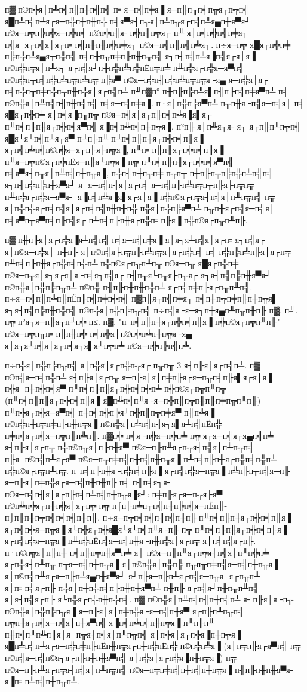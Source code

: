 п▓ п©п╬я│п╩п╣п╢п╫п╣п╣ п╡я─п╣п╪я▐ я─п╟п╥п╡п╦я┌п╦п╣ я█п╩п╣п╨я┌я─п╬п╫п╫п╬ п╡я▀я┤п╦я│п╩п╦я┌п╣п╩я▄п╫я▀я┘ п©я─п╦п╠п╬я─п╬п╡ п©п╬п╢я┘п╬п╢п╦я┌
п╨ я│п╡п╬п╣п╪я┐ п╣я│я┌п╣я│я┌п╡п╣п╫п╫п╬п╪я┐ п©я─п╣п╢п╣п╩я┐. п÷я─п╦ я█я┌п╬п╪ п╠п╬п╩я▄я┬п╬п╣ п╡п╫п╦п╪п╟п╫п╦п╣ я┐п╢п╣п╩я▐п╣я┌я│я▐
п©п╬п╦я│п╨я┐ я┌п╣я┘п╫п╬п╩п╬пЁп╦п╧ п╨п╬я┌п╬я─я▀п╣ п©п╬п╥п╡п╬п╩п╦п╩п╦ п╠я▀ п©я─п╬п╢п╬п╩п╤п╦я┌я▄ я─п╬я│я┌ п╡п╬п╥п╪п╬п╤п╫п╬я│я┌п╣п╧
п╜п▓п° п╫п╟п╠п╩я▌п╢п╟п╣п╪я▀п╧ п╡ п©п╬я│п╩п╣п╢п╫п╣п╣ п╡я─п╣п╪я▐. п·я│п╬п╠я▀п╧ п╦п╫я┌п╣я─п╣я│ п╡ я█я┌п╬п╧ я│п╡я▐п╥п╦
п©я─п╣я│я┌п╟п╡п╩я▐я▌я┌ п╨п╡п╟п╫я┌п╬п╡я▀п╣ я▐п╡п╩п╣п╫п╦я▐. п²п╟ я│п╩я┐я┘я┐ я┌п╟п╨п╦п╣ я█я└я└п╣п╨я┌я▀ п╨п╟п╨ п╨п╡п╟п╫я┌п╬п╡п╟я▐
я┌п╣п╩п╣п©п╬я─я┌п╟я├п╦я▐, п╨п╡п╟п╫я┌п╬п╡п╟я▐ п╨я─п╦п©я┌п╬пЁя─п╟я└п╦я▐ п╦ п╨п╡п╟п╫я┌п╬п╡я▀п╣ п╡я▀я┤п╦я│п╩п╣п╫п╦я▐, п╬п╢п╫п╦п╪ п╦п╥
п╫п╟п╦п╠п╬п╩п╣п╣ я┐п╢п╬п╠п╫я▀я┘ я│я─п╣п╢я│я┌п╡ я─п╣п╟п╩п╦п╥п╟я├п╦п╦ п╨п╬я┌п╬я─я▀я┘ я▐п╡п╩я▐я▌я┌я│я▐ п╬п©я┌п╦я┤п╣я│п╨п╦п╣ п╦ я│п╬п╬я┌п╡п╣я│я┌п╡п╣п╫п╫п╬
п╬я│п╬п╠я▀п╧ п╦п╫я┌п╣я─п╣я│ п╡я▀п╥я▀п╡п╟п╣я┌ п╨п╡п╟п╫я┌п╬п╡п╟я▐ п╬п©я┌п╦п╨п╟.  

п▓ п╫п╟я│я┌п╬я▐я┴п╣п╣ п╡я─п╣п╪я▐ я│я┐я┴п╣я│я┌п╡я┐п╣я┌ я│п©я─п╬я│ п╫п╟ я│п©п╣я├п╦п╟п╩п╦я│я┌п╬п╡ п╡ п╬п╠п╩п╟я│я┌п╦ п╨п╡п╟п╫я┌п╬п╡п╬п╧
п╬п©я┌п╦п╨п╦ п©я─п╦ я█я┌п╬п╪ п©я─п╦я│я┐я┌я│я┌п╡я┐п╣я┌ п╢п╦я└п╦я├п╦я┌ я┐я┤п╣п╠п╫я▀я┘ п©п╬я│п╬п╠п╦п╧ п©п╬ п╢п╟п╫п╫п╬п╧
я┌п╣п╪п╟я┌п╦п╨п╣. п÷я─п╣п╢п╩п╟пЁп╟п╣п╪п╬п╣ п▓п╟я┬п╣п╪я┐ п╡п╫п╦п╪п╟п╫п╦я▌ я┐я┤п╣п╠п╫п╬п╣ п©п╬я│п╬п╠п╦п╣ п÷п╣я┌я─я┐п╫я▄п╨п╦п╫п╟
п▓. п╝. п╦ п°я┐я─п╟я┬п╨п╬ п≤. п▓. "п п╡п╟п╫я┌п╬п╡п╟я▐ п╬п©я┌п╦п╨п╟" п©я─п╦п╥п╡п╟п╫п╬ п╡п╬я│п©п╬п╩п╫п╦я┌я▄
я│я┐я┴п╣я│я┌п╡я┐я▌я┴п╦п╧ п©я─п╬п╠п╣п╩. 

п÷п╬я│п╬п╠п╦п╣ я│п╬я│я┌п╬п╦я┌ п╦п╥ 3 я┤п╟я│я┌п╣п╧. п▓ п©п╣я─п╡п╬п╧ я┤п╟я│я┌п╦ я─п╟я│я│п╪п╟я┌я─п╦п╡п╟я▌я┌я│я▐ п╬я│п╫п╬п╡я▀
п╨п╡п╟п╫я┌п╬п╡п╬п╧ п╬п©я┌п╦п╨п╦ (п╨п╡п╟п╫я┌п╬п╡п╟я▐ я█п╩п╣п╨я┌я─п╬п╢п╦п╫п╟п╪п╦п╨п╟) п╨п╬я┌п╬я─я▀п╣ п╫п╣п╬п╠я┘п╬п╢п╦п╪я▀ п╢п╩я▐
п©п╬п╫п╦п╪п╟п╫п╦я▐ п©п╬я│п╩п╣п╢я┐я▌я┴п╣пЁп╬ п╪п╣я┌п╣я─п╦п╟п╩п╟. п▓п╬ п╡я┌п╬я─п╬п╧ п╦ я┌я─п╣я┌я▄п╣п╧
я┤п╟я│я┌п╦ п╬п©п╦я│п╟п╫я▀ п©я─п╟п╨я┌п╦я┤п╣я│п╨п╦п╣ п╟я│п©п╣п╨я┌я▀ п©я─п╦п╪п╣п╫п╣п╫п╦я▐ п╨п╡п╟п╫я┌п╬п╡п╬п╧
п╬п©я┌п╦п╨п╦. п п╡п╟п╫я┌п╬п╡п╟я▐ я┌п╣п╬я─п╦я▐ п╩п╟п╥п╣я─п╟ я─п╟я│п╪п╬я┌я─п╣п╫п╫п╟ п╡ п╢п╡я┐я┘ п©я─п╣п╢я│я┌п╟п╡п╩п╣п╫п╦я▐я┘:
п╪п╟я┌я─п╦я├я▀ п©п╩п╬я┌п╫п╬я│я┌п╦ п╦ п⌠п╟п╧п╥п╣п╫п╠п╣я─пЁп╟-п⌡п╟п╫п╤п╣п╡п╣п╫п╟. п÷я─п╦п╡п╣п╢п╣п╫п╟ п╨п╡п╟п╫я┌п╬п╡п╟я▐ я┌п╣п╬я─п╦я▐
я└п╬я┌п╬я█я└я└п╣п╨я┌п╟ п╦ п╨п╡п╟п╫я┌п╬п╡п╟я▐ я┌п╣п╬я─п╦я▐ п╨п╬пЁп╣я─п╣п╫я┌п╫п╬я│я┌п╦ я│п╡п╣я┌п╟. п·п©п╦я│п╟п╫ п╡п╟п╤п╫я▀п╧
я│ п©я─п╟п╨я┌п╦я┤п╣я│п╨п╬п╧ я┌п╬я┤п╨п╦ п╥я─п╣п╫п╦я▐ я│п©п╬я│п╬п╠ п╦п╥п╪п╣я─п╣п╫п╦я▐ я│п©п╣п╨я┌я─п╟п╩я▄п╫я▀я┘
я┘п╟я─п╟п╨я┌п╣я─п╦я│я┌п╦п╨ я│п╡п╣я┌п╟ п╬я│п╫п╬п╡п╟п╫п╫я▀п╧ п╫п╟ я┌п╣я┘п╫п╦п╨п╣ я│я┤п╣я┌п╟ я└п╬я┌п╬п╫п╬п╡. п▓ п©п╬я│п╩п╣п╢п╫п╣п╧
я┤п╟я│я┌п╦ п©п╬я│п╬п╠п╦я▐ я─п╟я│я│п╪п╬я┌я─п╣п╫я▀ я┌п╟п╨п╦п╣ п╦п╫я┌п╣я─п╣я│п╫я▀п╣ я▐п╡п╩п╣п╫п╦я▐ п╨п╟п╨ п╫п╣п╨п╩п╟я│я│п╦я┤п╣я│п╨п╦п╣
я│п╬я│я┌п╬я▐п╫п╦я▐ я█п╩п╣п╨я┌я─п╬п╪п╟пЁп╫п╦я┌п╫п╬пЁп╬ п©п╬п╩я▐ (я│п╤п╟я┌я▀п╣ п╦ п©п╣я─п╣п©я┐я┌п╟п╫п╫я▀п╣ я│п╬я│я┌п╬я▐п╫п╦я▐) п╦
п©я─п╟п╨я┌п╦я┤п╣я│п╨п╦п╣ п©я─п╦п╪п╣п╫п╣п╫п╦я▐ п╢п╟п╫п╫я▀я┘ я▐п╡п╩п╣п╫п╦п╧.  

